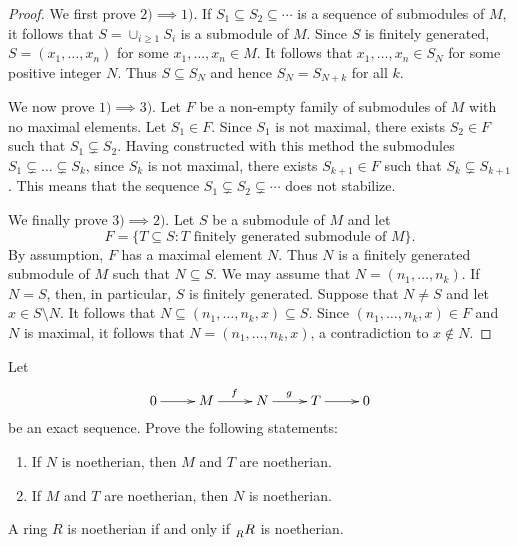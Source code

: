 \begin{proof}
	We first prove $2)\implies1)$. If $S_1\subseteq S_2\subseteq\cdots$ is a sequence of submodules of $M$, 
	it follows that $S=\cup_{i\geq 1}S_i$ is a submodule of $M$. Since $S$ is finitely generated, 
	$S=(x_1,\dots,x_n)$ for some $x_1,\dots,x_n\in M$. It follows that 
	$x_1,\dots,x_n\in S_N$ for some positive integer $N$. Thus 
	$S\subseteq S_N$ and hence $S_N=S_{N+k}$ for all $k$. 
	
	We now prove $1)\implies3)$. Let $F$ be a non-empty family of submodules of $M$ with no maximal elements. 
	Let $S_1\in F$. Since $S_1$ is not maximal, there exists $S_2\in F$ such that $S_1\subsetneq S_2$. 
	Having constructed with this method the submodules $S_1\subsetneq\dots\subsetneq S_k$, since $S_k$ is not
	maximal, there exists $S_{k+1}\in F$ such that $S_k\subsetneq S_{k+1}$. 
	This means that the sequence 
	$S_1\subsetneq S_2\subsetneq\cdots$ does not stabilize. 
	
	We finally prove $3)\implies2)$. Let $S$ be a submodule of $M$ and let 
	\[
	F=\{T\subseteq S:T\text{ finitely generated submodule of $M$}\}.
	\]
	By assumption, $F$ has a maximal element $N$. Thus
	$N$ is a finitely generated submodule of $M$ such that $N\subseteq S$. We may assume that 
	$N=(n_1,\dots,n_k)$. If $N=S$, then, in particular, $S$ is finitely generated. Suppose that
	$N\ne S$ and let $x\in S\setminus N$. It follows that  
	$N\subseteq (n_1,\dots,n_k,x)\subseteq S$. Since 
	$(n_1,\dots,n_k,x)\in F$ and $N$ is maximal, it follows that 
	$N=(n_1,\dots,n_k,x)$, a contradiction
	to $x\not\in N$. 
\end{proof}

\begin{exercise}
\label{xca:exacta_noetheriano}
	Let   
	\[  
		\xymatrix{
        0\ar[r]
        & M
        \ar[r]^f
        & N
        \ar[r]^g
        & T\ar[r]
        & 0	
        }
     \]
     be an exact sequence. Prove the following statements:
     \begin{enumerate}
     	\item If $N$ is noetherian, then $M$ and $T$ are noetherian.
     	\item If $M$ and $T$ are noetherian, then $N$ is noetherian.
     \end{enumerate}	
\end{exercise}

\begin{exercise}
\label{xca:regular_noetheriano}
A ring $R$ is noetherian if and only if $\prescript{}{R}R$ is noetherian.	
\end{exercise}

